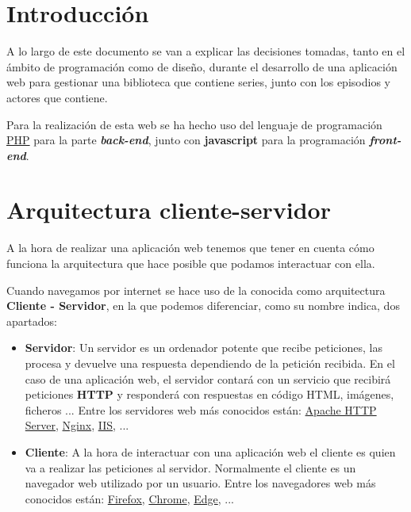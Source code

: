\documentclass{\ClassPath/viu-tfm-template}
\begin{document}
\graphicspath{{../../VIU_TFM_LaTeX_template/}}

\coverpage

\tableofcontents

\chapter{Introducción}

A lo largo de este documento se van a explicar las decisiones tomadas, tanto en el ámbito de programación como de diseño, durante el desarrollo de una aplicación web para gestionar una biblioteca que contiene series, junto con los episodios y actores que contiene.

Para la realización de esta web se ha hecho uso del lenguaje de programación \href{https://www.php.net/}{PHP} para la parte \textit{\textbf{back-end}}, junto con \textbf{javascript} para la programación \textbf{\textit{front-end}}.


\chapter{Arquitectura cliente-servidor}
A la hora de realizar una aplicación web tenemos que tener en cuenta cómo funciona la arquitectura que hace posible que podamos interactuar con ella.

Cuando navegamos por internet se hace uso de la conocida como arquitectura \textbf{Cliente - Servidor}, en la que podemos diferenciar, como su nombre indica, dos apartados:

\vspace{-1em}
\begin{itemize}
    \item \textbf{Servidor}: Un servidor es un ordenador potente que recibe peticiones, las procesa y devuelve una respuesta dependiendo de la petición recibida. En el caso de una aplicación web, el servidor contará con un servicio que recibirá peticiones \textbf{HTTP} y responderá con respuestas en código HTML, imágenes, ficheros ... Entre los servidores web más conocidos están: \href{https://httpd.apache.org/}{Apache HTTP Server}, \href{https://nginx.org/}{Nginx}, \href{https://www.iis.net/}{IIS}, ...

    \item \textbf{Cliente}: A la hora de interactuar con una aplicación web el cliente es quien va a realizar las peticiones al servidor. Normalmente el cliente es un navegador web utilizado por un usuario. Entre los navegadores web más conocidos están: \href{https://www.mozilla.org/es-ES/firefox/}{Firefox}, \href{https://www.google.com/chrome/}{Chrome}, \href{https://www.microsoft.com/es-es/edge}{Edge}, ...
\end{itemize}
\vspace{-1em}
\end{document}
